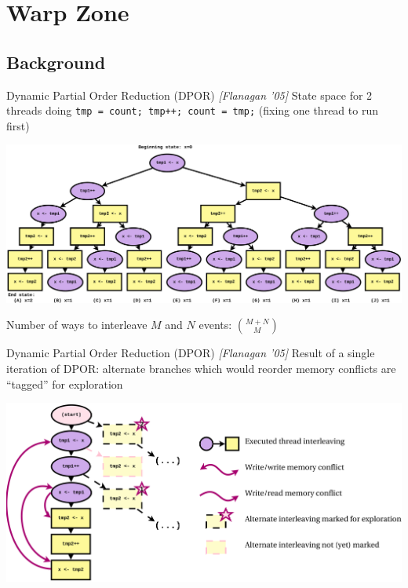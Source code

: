 \documentclass[xcolor=dvipsnames]{beamer}
\begin{document}
\section{Warp Zone}

\subsection{Background}

\begin{frame}{Dynamic Partial Order Reduction (DPOR) {\em [Flanagan '05]}}
	State space for 2 threads doing {\tt tmp = count; tmp++; count = tmp;} (fixing one thread to run first)
	\begin{center}
		\includegraphics[width=\textwidth]{../statespace-tree.pdf}
	\end{center}
	\linegap

	Number of ways to interleave $M$ and $N$ events: ${M+N \choose M}$
\end{frame}
\begin{frame}{Dynamic Partial Order Reduction (DPOR) {\em [Flanagan '05]}}
	Result of a single iteration of DPOR: alternate branches
	which would reorder memory conflicts are ``tagged'' for exploration
	\begin{center}
		\includegraphics[width=\textwidth]{../dpor-example-0.pdf}
	\end{center}
\end{frame}
\end{document}
